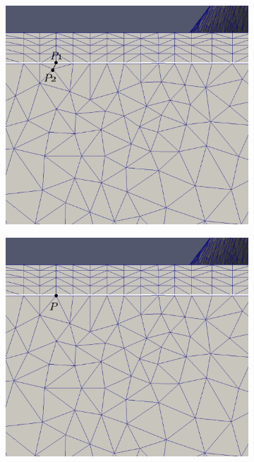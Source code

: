 \documentclass[conf]{new-aiaa}
\begin{document}
\begin{figure}[hbt!]
\begin{subfigure}{.4\textwidth}
  \caption{}
  \label{cc2}
\end{subfigure}
\begin{subfigure}{.4\textwidth}
  \centering
  \includegraphics[width=.9\linewidth, trim={0 5cm 0  0}, clip]{interior-vert-collapse/cc3.eps}
  \caption{}
  \label{cc3}
\end{subfigure}%
\begin{subfigure}{.4\textwidth}
  \centering
  \includegraphics[width=.9\linewidth, trim={0 5cm 0  0}, clip]{interior-vert-collapse/cc4.eps}
  \caption{}
  \label{cc4}
\end{subfigure}

\end{figure}
\end{document}
